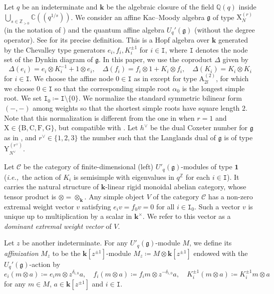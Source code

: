\documentclass[12pt]{amsart}
\theoremstyle{definition}
\theoremstyle{remark}
\numberwithin{equation}{section}
\newcommand{\ie}{\textit{i.e.,}\ }
\begin{document}
Let $q$ be an indeterminate and $\mathbf{k}$ be the algebraic closure of the field $\mathbb{Q}(q)$ inside $\bigcup_{s \in \mathbb{Z}_{>0}}{\mathbb{C}}(\!(q^{1/s})\!)$. 
We consider an affine Kac--Moody algebra $\mathfrak{g}$ of type $\mathrm{X}_{N}^{(r)}$ (in the notation of \cite[Chapter 4]{Kac}) and the quantum affine algebra  $U_q'(\mathfrak{g})$ (without the degree operator).  
See \cite[\S2]{kkop-2020} for its precise definition.
This is a Hopf algebra over $\mathbf{k}$ generated by the Chevalley type generators $e_i, f_i, K_i^{\pm 1}$ for $i \in \mathtt{I}$, where $\mathtt{I}$ denotes the node set of the Dynkin diagram of $\mathfrak{g}$.   
In this paper, we use the coproduct $\Delta$ given by
\[ \Delta(e_i) =  e_i \otimes K_i^{-1} + 1 \otimes e_i, \quad 
\Delta(f_i) = f_i \otimes 1 + K_i \otimes f_i, \quad \Delta(K_i) = K_i \otimes K_i\]
for $i \in \mathtt{I}$.
We choose the affine node $0 \in \mathtt{I}$ as in \cite[Chapter 4]{Kac} except for type $\mathrm{A}_{2l}^{(2)}$, for which we choose $0\in \mathtt{I}$ so that the corresponding simple root $\alpha_0$ is the longest simple root. 
We set $\mathtt{I}_0 \coloneqq \mathtt{I} \setminus \{ 0\}$.
We normalize the standard symmetric bilinear form $(-,-)$ among weights so that the shortest simple roots have  square length $2$.  
Note that this normalization is different from the one in \cite{kkop-2020, kkop-2024} when $r=1$ and $\mathrm{X} \in \{\mathrm{B, C, F, G}\}$, but compatible with \cite{HL16}.
Let $h^\vee$ be the dual Coxeter number for $\mathfrak{g}$ as in \cite[Chapter 6]{Kac}, and $r^\vee \in \{1,2,3 \}$ the number such that the Langlands dual of $\mathfrak{g}$ is of type $\mathrm{Y}_{N^\vee}^{(r^\vee)}$.

Let $\mathscr{C}$ be the category of finite-dimensional (left) $U'_q(\mathfrak{g})$-modules of type $\mathbf{1}$ (\ie the action of $K_i$ is semisimple with eigenvalues in $q^\mathbb{Z}$ for each $i \in \mathtt{I}$).
It carries the natural structure of $\mathbf{k}$-linear rigid monoidal abelian category, whose tensor product is $\otimes = \otimes_{\mathbf{k}}$. 
Any simple object $V$ of the category $\mathscr{C}$ has a non-zero extremal weight vector $v$  satisfying $e_i v= f_0 v = 0$ for all $i \in \mathtt{I}_0$. 
Such a vector $v$ is unique up to multiplication by a scalar in $\mathbf{k}^\times$.
We refer to this vector as a {\em dominant extremal weight vector} of $V$.

Let $z$ be another indeterminate. 
For any $U'_q(\mathfrak{g})$-module $M$, we define its {\em affinization} $M_z$ to be the $\mathbf{k}[z^{\pm 1}]$-module $M_z \coloneqq M \otimes \mathbf{k}[z^{\pm 1}]$ endowed with the $U_q'(\mathfrak{g})$-action by 
\[ e_i (m \otimes a) \coloneqq e_i m \otimes z^{\delta_{i,0}}a, \quad 
f_i (m\otimes a) \coloneqq f_i m \otimes z^{-\delta_{i,0}} a, \quad 
K_i^{\pm 1} (m \otimes a) \coloneqq K_i^{\pm1} m \otimes a\]
for any $m \in M$, $a \in \mathbf{k}[z^{\pm 1}]$ and $i\in \mathtt{I}$. 
\end{document}
